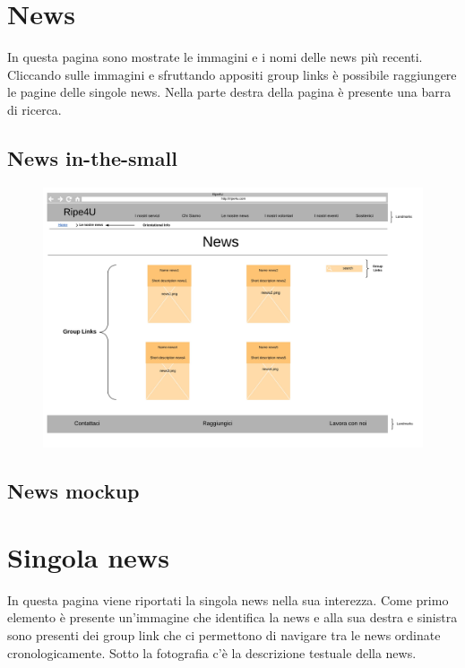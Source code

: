     \section{News}
    In questa pagina sono mostrate le immagini e i nomi delle news più recenti.
    Cliccando sulle immagini e sfruttando appositi group links è possibile
    raggiungere le pagine delle singole news. Nella parte destra della pagina è
    presente una barra di ricerca.

        \subsection{News in-the-small}
        \begin{figure}[H]
            \centering
            \includegraphics[scale=0.37]{resources/images/news-in-the-small.jpg}
        \end{figure}

        \subsection{News mockup}
    
    \section{Singola news}
    In questa pagina viene riportati la singola news nella sua interezza. Come
    primo elemento è presente un'immagine che identifica la news e alla sua
    destra e sinistra sono presenti dei group link che ci permettono di navigare
    tra le news ordinate cronologicamente. Sotto la fotografia c'è la
    descrizione testuale della news.

